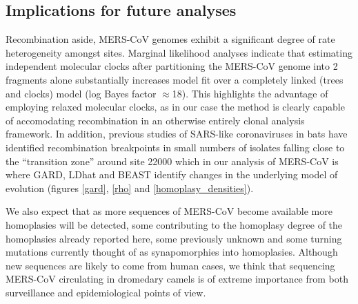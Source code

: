 \documentclass[11pt,oneside,letterpaper]{article}
\begin{document}
\subsection*{Implications for future analyses}
Recombination aside, MERS-CoV genomes exhibit a significant degree of rate heterogeneity amongst sites.
Marginal likelihood analyses indicate that estimating independent molecular clocks after partitioning the MERS-CoV genome into 2 fragments alone substantially increases model fit over a completely linked (trees and clocks) model (log Bayes factor $\approx$18).
This highlights the advantage of employing relaxed molecular clocks, as in our case the method is clearly capable of accomodating recombination in an otherwise entirely clonal analysis framework.
In addition, previous studies of SARS-like coronaviruses in bats have identified recombination breakpoints in small numbers of isolates falling close to the ``transition zone'' around site 22000 \citep{hon_2008,lau_2010} which in our analysis of MERS-CoV is where GARD, LDhat and BEAST identify changes in the underlying model of evolution (figures \ref{gard}, \ref{rho} and \ref{homoplasy_densities}).

We also expect that as more sequences of MERS-CoV become available more homoplasies will be detected, some contributing to the homoplasy degree of the homoplasies already reported here, some previously unknown and some turning mutations currently thought of as synapomorphies into homoplasies.
Although new sequences are likely to come from human cases, we think that sequencing MERS-CoV circulating in dromedary camels is of extreme importance from both surveillance and epidemiological points of view.
\end{document}
